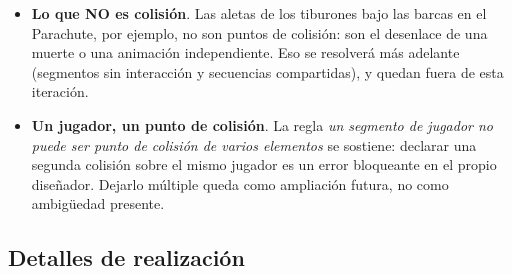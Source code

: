\begin{itemize}
	quedan intactos. Ninguna colisión puede quedar sin comportamiento: el motor nunca
	tiene que preguntarse qué pasa. El contador interno se toca \textbf{una sola vez},
	en la decisión (no en cada desenlace por separado).
	\item \textbf{Lo que NO es colisión}. Las aletas de los tiburones bajo las barcas en el Parachute, por ejemplo, no
	son puntos de colisión: son el desenlace de una muerte o una animación
	independiente. Eso se resolverá más adelante (segmentos sin
	interacción y secuencias compartidas), y quedan fuera de esta iteración.
	\item \textbf{Un jugador, un punto de colisión}. La regla \emph{un segmento de
		jugador no puede ser punto de colisión de varios elementos} se sostiene: declarar
	una segunda colisión sobre el mismo jugador es un error bloqueante en el propio
	diseñador. Dejarlo múltiple queda como ampliación futura, no como ambigüedad
	presente.
\end{itemize}

\subsection{Detalles de realización}
\label{subsec:DetallesF3I7}

